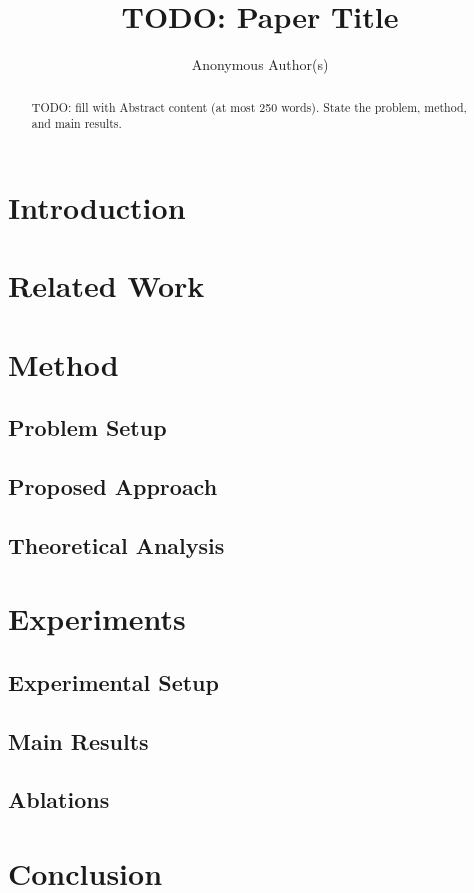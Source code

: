 \documentclass{article}
\title{TODO: Paper Title}
\author{Anonymous Author(s)}
\begin{document}
\maketitle

\begin{abstract}
TODO: fill with Abstract content (at most 250 words). State the problem, method, and main results.
\end{abstract}

\section{Introduction}

\section{Related Work}

\section{Method}

\subsection{Problem Setup}

\subsection{Proposed Approach}

\subsection{Theoretical Analysis}

\section{Experiments}

\subsection{Experimental Setup}

\subsection{Main Results}

\subsection{Ablations}

\section{Conclusion}



\end{document}
